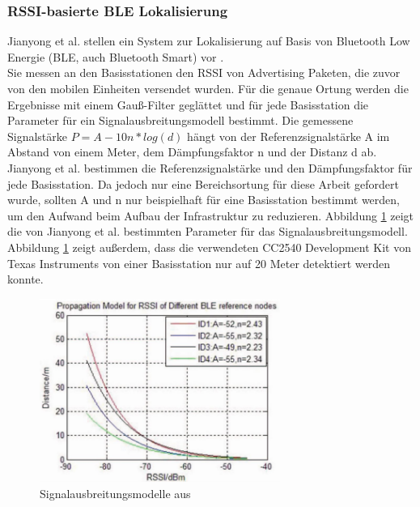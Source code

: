 \subsubsection{RSSI-basierte BLE Lokalisierung}
Jianyong et al. stellen ein System zur Lokalisierung auf Basis von Bluetooth Low Energie (BLE, auch Bluetooth Smart) vor \cite{jianyong2014rssi}. \\
Sie messen an den Basisstationen den RSSI von Advertising Paketen, die zuvor von den mobilen Einheiten versendet wurden.
Für die genaue Ortung werden die Ergebnisse mit einem Gauß-Filter geglättet und für jede Basisstation die Parameter für ein Signalausbreitungsmodell bestimmt.
Die gemessene Signalstärke $P = A - 10n*log(d)$ hängt von der Referenzsignalstärke A im Abstand von einem Meter, dem Dämpfungsfaktor n und der Distanz d ab. \\
Jianyong et al. bestimmen die Referenzsignalstärke und den Dämpfungsfaktor für jede Basisstation.
Da jedoch nur eine Bereichsortung für diese Arbeit gefordert wurde, sollten A und n nur beispielhaft für eine Basisstation bestimmt werden, um den Aufwand beim Aufbau der Infrastruktur zu reduzieren.
Abbildung \ref{fig:blemodel} zeigt die von Jianyong et al. bestimmten Parameter für das Signalausbreitungsmodell. 
Abbildung \ref{fig:blemodel} zeigt außerdem, dass die verwendeten CC2540 Development Kit von Texas Instruments von einer Basisstation nur auf 20 Meter detektiert werden konnte.


\begin{figure}[h]
  \centering
	\includegraphics[width=0.7\textwidth]{images/blemodel.png}
  \caption{Signalausbreitungsmodelle aus \cite{jianyong2014rssi}}
  \label{fig:blemodel}
\end{figure}

